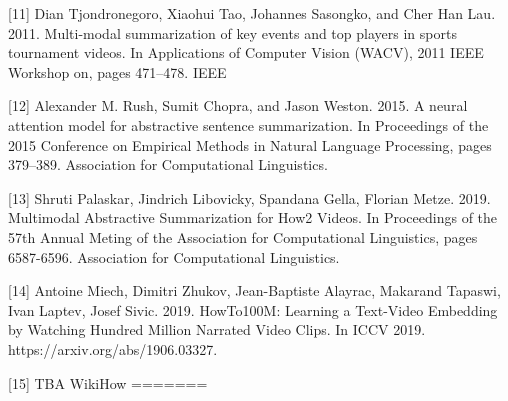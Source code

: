 \documentclass{article}
\begin{document}
[11] Dian Tjondronegoro, Xiaohui Tao, Johannes Sasongko, and Cher Han Lau. 2011. Multi-modal summarization of key events and top players in sports tournament videos. In Applications of Computer Vision (WACV), 2011 IEEE Workshop on, pages 471–478. IEEE

[12] Alexander M. Rush, Sumit Chopra, and Jason Weston. 2015. A neural attention model for abstractive sentence summarization. In Proceedings of the 2015 Conference on Empirical Methods in Natural Language Processing, pages 379–389. Association for Computational Linguistics.

[13] Shruti Palaskar, Jindrich Libovicky, Spandana Gella, Florian Metze. 2019. Multimodal Abstractive Summarization for How2 Videos. In Proceedings of the 57th Annual Meting of the Association for Computational Linguistics, pages 6587-6596. Association for Computational Linguistics.

[14] Antoine Miech, Dimitri Zhukov, Jean-Baptiste Alayrac, Makarand Tapaswi, Ivan Laptev, Josef Sivic. 2019. HowTo100M: Learning a Text-Video Embedding by Watching Hundred Million Narrated Video Clips. In ICCV 2019. https://arxiv.org/abs/1906.03327.
 
[15] TBA WikiHow
=======
\end{document}

